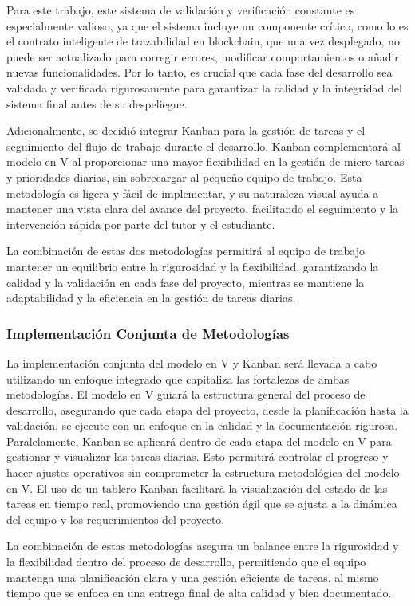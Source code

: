 \documentclass[main.tex]{subfiles}
\begin{document}
Para este trabajo, este sistema de validación y verificación constante es especialmente valioso, ya que el sistema incluye un componente crítico, como lo es el contrato inteligente de trazabilidad en blockchain, que una vez desplegado, no puede ser actualizado para corregir errores, modificar comportamientos o añadir nuevas funcionalidades. Por lo tanto, es crucial que cada fase del desarrollo sea validada y verificada rigurosamente para garantizar la calidad y la integridad del sistema final antes de su despeliegue.

Adicionalmente, se decidió integrar Kanban para la gestión de tareas y el seguimiento del flujo de trabajo durante el desarrollo. Kanban complementará al modelo en V al proporcionar una mayor flexibilidad en la gestión de micro-tareas y prioridades diarias, sin sobrecargar al pequeño equipo de trabajo. Esta metodología es ligera y fácil de implementar, y su naturaleza visual ayuda a mantener una vista clara del avance del proyecto, facilitando el seguimiento y la intervención rápida por parte del tutor y el estudiante.

La combinación de estas dos metodologías permitirá al equipo de trabajo mantener un equilibrio entre la rigurosidad y la flexibilidad, garantizando la calidad y la validación en cada fase del proyecto, mientras se mantiene la adaptabilidad y la eficiencia en la gestión de tareas diarias.

\subsubsection{Implementación Conjunta de Metodologías}

La implementación conjunta del modelo en V y Kanban será llevada a cabo utilizando un enfoque integrado que capitaliza las fortalezas de ambas metodologías. El modelo en V guiará la estructura general del proceso de desarrollo, asegurando que cada etapa del proyecto, desde la planificación hasta la validación, se ejecute con un enfoque en la calidad y la documentación rigurosa. Paralelamente, Kanban se aplicará dentro de cada etapa del modelo en V para gestionar y visualizar las tareas diarias. Esto permitirá controlar el progreso y hacer ajustes operativos sin comprometer la estructura metodológica del modelo en V. El uso de un tablero Kanban facilitará la visualización del estado de las tareas en tiempo real, promoviendo una gestión ágil que se ajusta a la dinámica del equipo y los requerimientos del proyecto.

La combinación de estas metodologías asegura un balance entre la rigurosidad y la flexibilidad dentro del proceso de desarrollo, permitiendo que el equipo mantenga una planificación clara y una gestión eficiente de tareas, al mismo tiempo que se enfoca en una entrega final de alta calidad y bien documentado.


\end{document}
